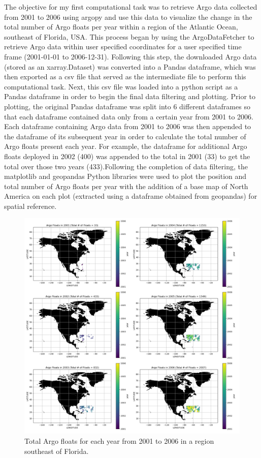 \documentclass{article}
\begin{document}
The objective for my first computational task was to retrieve Argo data collected from 2001 to 2006 using argopy and use this data to visualize the change in the total number of Argo floats per year within a region of the Atlantic Ocean, southeast of Florida, USA. This process began by using the ArgoDataFetcher to retrieve Argo data within user specified coordinates for a user specified time frame (2001-01-01 to 2006-12-31). Following this step, the downloaded Argo data (stored as an xarray.Dataset) was converted into a Pandas dataframe, which was then exported as a csv file that served as the intermediate file to perform this computational task. Next, this csv file was loaded into a python script as a Pandas dataframe in order to begin the final data filtering and plotting. Prior to plotting, the original Pandas dataframe was split into 6 different dataframes so that each dataframe contained data only from a certain year from 2001 to 2006. Each dataframe containing Argo data from 2001 to 2006 was then appended to the dataframe of its subsequent year in order to calculate the total number of Argo floats present each year. For example, the dataframe for additional Argo floats deployed in 2002 (400) was appended to the total in 2001 (33) to get the total over those two years (433).Following the completion of data filtering, the matplotlib and geopandas Python libraries were used to plot the position and total number of Argo floats per year with the addition of a base map of North America on each plot (extracted using a dataframe obtained from geopandas) for spatial reference.

\begin{figure}[H]
\includegraphics[width=\textwidth,height=\textheight,keepaspectratio]{total_argo.png}
\caption{Total Argo floats for each year from 2001 to 2006 in a region southeast of Florida.}
 
\end{figure}
\end{document}
